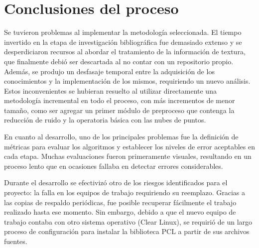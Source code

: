 \section{Conclusiones del proceso}
Se tuvieron problemas al implementar la metodología seleccionada.
El tiempo invertido en la etapa de investigación bibliográfica fue demasiado extenso
y se desperdiciaron recursos al abordar el tratamiento de la información de textura,
que finalmente debió ser descartada al no contar con un repositorio propio.
Además, se produjo un desfasaje temporal entre la adquisición de los conocimientos y la
implementación de los mismos, requiriendo un nuevo análisis.
Estos inconvenientes se hubieran resuelto
al utilizar directamente una metodología incremental en todo el proceso,
con más incrementos de menor tamaño, como ser agregar un primer módulo
de preproceso que contenga la reducción de ruido y la operatoria básica con las
nubes de puntos.

En cuanto al desarrollo, uno de los principales problemas fue la definición de métricas
para evaluar los algoritmos y establecer los niveles de error aceptables en cada etapa.
Muchas evaluaciones fueron primeramente visuales, resultando en un proceso lento
que en ocasiones fallaba en detectar errores considerables.

Durante el desarrollo se efectivizó otro de los riesgos identificados para el proyecto:
la falla en los equipos de trabajo requiriendo su reemplazo.
Gracias a las copias de respaldo periódicas, fue posible recuperar fácilmente el trabajo realizado hasta ese momento.
Sin embargo, debido a que el nuevo equipo de trabajo contaba con otro sistema operativo (Clear Linux),
se requirió de un largo proceso de configuración para instalar la biblioteca PCL a partir de sus archivos fuentes.

